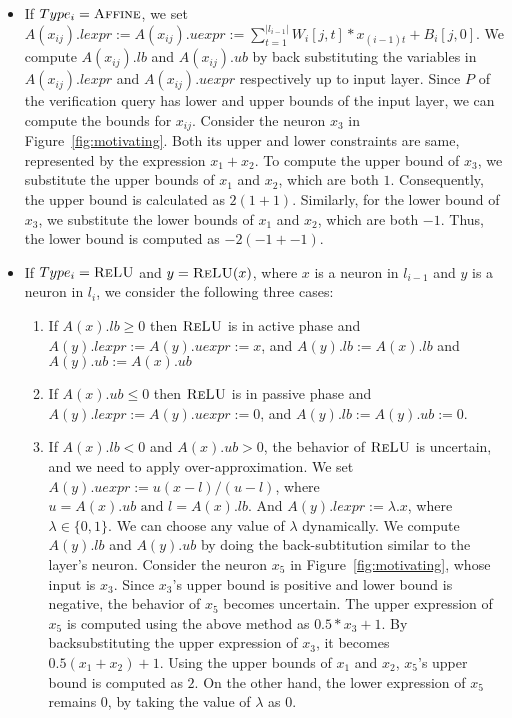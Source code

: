 \begin{itemize}
\item If $Type_i= \textsc{Affine}$, we set 
  $A(x_{ij}).lexpr := A(x_{ij}).uexpr := \sum_{t=1}^{|l_{i-1}|} W_i[j,t]*x_{(i-1)t} + B_i[j,0]$.
  We compute $A(x_{ij}).lb$ and $A(x_{ij}).ub$ by back substituting
  the variables in $A(x_{ij}).lexpr$ and $A(x_{ij}).uexpr$ respectively up to input layer.
  Since $P$ of the verification query has lower and upper bounds of the input layer,
  we can compute the bounds for $x_{ij}$. 
  Consider the neuron $x_3$ in Figure~\ref{fig:motivating}. 
  Both its upper and lower constraints are same, represented by the expression $x_1 + x_2$. 
  To compute the upper bound of $x_3$, we substitute the upper bounds of $x_1$ and $x_2$, which are both $1$. 
  Consequently, the upper bound is calculated as $2 (1 + 1)$. 
  Similarly, for the lower bound of $x_3$, we substitute the lower bounds of $x_1$ and $x_2$, which are both $-1$. 
  Thus, the lower bound is computed as $-2 (-1 + -1)$.

\item If $Type_i= \textsc{ReLU}$ and $y=\textsc{ReLU}(x)$, where $x$ is a neuron in $l_{i-1}$ and $y$ is a neuron in $l_i$, we consider the following three cases: %
  \begin{enumerate}
  \item \sloppy If $A(x).lb \geq 0$ then $\textsc{ReLU}$ is in active phase and
    $A(y).lexpr := A(y).uexpr := x$,
    and $A(y).lb := A(x).lb$ and $A(y).ub := A(x).ub$
  \item If $A(x).ub \leq 0$ then $\textsc{ReLU}$ is in passive phase and
    $A(y).lexpr := A(y).uexpr := 0$, 
    and $A(y).lb := A(y).ub := 0$.
  \item  If $A(x).lb < 0$ and $A(x).ub > 0$,
    the behavior of $\textsc{ReLU}$ is uncertain, and we need to apply
    over-approximation. We set $A(y).uexpr := u(x - l) / (u - l)$, 
    where $u = A(x).ub \text{ and } l = A(x).lb$.
    And $A(y).lexpr := \lambda . x$, where $\lambda \in \{0,1\}$. 
    We can choose any value of $\lambda$ dynamically.
    We compute $A(y).lb$ and $A(y).ub$ by doing the back-subtitution similar to the \affine{} layer's neuron.
    Consider the neuron $x_5$ in Figure~\ref{fig:motivating}, whose input is $x_3$. 
    Since $x_3$'s upper bound is positive and lower bound is negative, the behavior of $x_5$ becomes uncertain. 
    The upper expression of $x_5$ is computed using the above method as $0.5 * x_3 + 1$. 
    By backsubstituting the upper expression of $x_3$, it becomes $0.5 (x_1 + x_2) + 1$. 
    Using the upper bounds of $x_1$ and $x_2$, $x_5$'s upper bound is computed as $2$. 
    On the other hand, the lower expression of $x_5$ remains $0$, by taking the value of $\lambda$ as $0$.  
  \end{enumerate}




\end{itemize}
